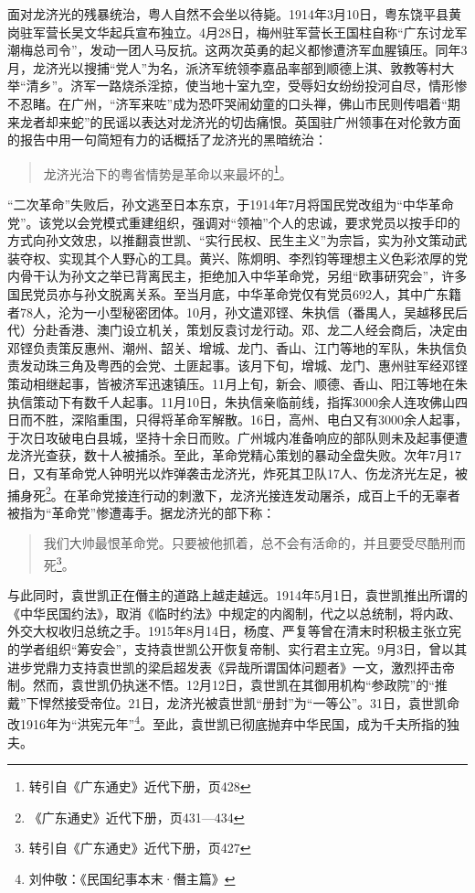 面对龙济光的残暴统治，粤人自然不会坐以待毙。1914年3月10日，粤东饶平县黄岗驻军营长吴文华起兵宣布独立。4月28日，梅州驻军营长王国柱自称“广东讨龙军潮梅总司令”，发动一团人马反抗。这两次英勇的起义都惨遭济军血腥镇压。同年3月，龙济光以搜捕“党人”为名，派济军统领李嘉品率部到顺德上淇、敦教等村大举“清乡”。济军一路烧杀淫掠，使当地十室九空，受辱妇女纷纷投河自尽，情形惨不忍睹。在广州，“济军来咗”成为恐吓哭闹幼童的口头禅，佛山市民则传唱着“期来龙者却来蛇”的民谣以表达对龙济光的切齿痛恨。英国驻广州领事在对伦敦方面的报告中用一句简短有力的话概括了龙济光的黑暗统治：

\begin{quote}

龙济光治下的粤省情势是革命以来最坏的\footnote{转引自《广东通史》近代下册，页428}。

\end{quote}

“二次革命”失败后，孙文逃至日本东京，于1914年7月将国民党改组为“中华革命党”。该党以会党模式重建组织，强调对“领袖”个人的忠诚，要求党员以按手印的方式向孙文效忠，以推翻袁世凯、“实行民权、民生主义”为宗旨，实为孙文策动武装夺权、实现其个人野心的工具。黄兴、陈炯明、李烈钧等理想主义色彩浓厚的党内骨干认为孙文之举已背离民主，拒绝加入中华革命党，另组“欧事研究会”，许多国民党员亦与孙文脱离关系。至当月底，中华革命党仅有党员692人，其中广东籍者78人，沦为一小型秘密团体。10月，孙文遣邓铿、朱执信（番禺人，吴越移民后代）分赴香港、澳门设立机关，策划反袁讨龙行动。邓、龙二人经会商后，决定由邓铿负责策反惠州、潮州、韶关、增城、龙门、香山、江门等地的军队，朱执信负责发动珠三角及粤西的会党、土匪起事。该月下旬，增城、龙门、惠州驻军经邓铿策动相继起事，皆被济军迅速镇压。11月上旬，新会、顺德、香山、阳江等地在朱执信策动下有数千人起事。11月10日，朱执信亲临前线，指挥3000余人连攻佛山四日而不胜，深陷重围，只得将革命军解散。16日，高州、电白又有3000余人起事，于次日攻破电白县城，坚持十余日而败。广州城内准备响应的部队则未及起事便遭龙济光查获，数十人被捕杀。至此，革命党精心策划的暴动全盘失败。次年7月17日，又有革命党人钟明光以炸弹袭击龙济光，炸死其卫队17人、伤龙济光左足，被捕身死\footnote{《广东通史》近代下册，页431—434}。在革命党接连行动的刺激下，龙济光接连发动屠杀，成百上千的无辜者被指为“革命党”惨遭毒手。据龙济光的部下称：

\begin{quote}

我们大帅最恨革命党。只要被他抓着，总不会有活命的，并且要受尽酷刑而死\footnote{转引自《广东通史》近代下册，页427}。

\end{quote}

与此同时，袁世凯正在僭主的道路上越走越远。1914年5月1日，袁世凯推出所谓的《中华民国约法》，取消《临时约法》中规定的内阁制，代之以总统制，将内政、外交大权收归总统之手。1915年8月14日，杨度、严复等曾在清末时积极主张立宪的学者组织“筹安会”，支持袁世凯公开恢复帝制、实行君主立宪。9月3日，曾以其进步党鼎力支持袁世凯的梁启超发表《异哉所谓国体问题者》一文，激烈抨击帝制。然而，袁世凯仍执迷不悟。12月12日，袁世凯在其御用机构“参政院”的“推戴”下悍然接受帝位。21日，龙济光被袁世凯“册封”为“一等公”。31日，袁世凯命改1916年为“洪宪元年”\footnote{刘仲敬：《民国纪事本末·僭主篇》}。至此，袁世凯已彻底抛弃中华民国，成为千夫所指的独夫。 

